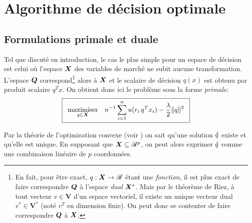 \section{Algorithme de décision optimale}




\subsection{Formulations primale et duale}

Tel que discuté en introduction, le cas le plus simple pour un espace de décision est
celui où l'espace $\X$ des variables de marché ne subit aucune transformation. L'espace
$\Q$ correspond\footnote{En fait, pour être exact, $q : \X \to \Re$ étant une
  \textit{fonction}, il est plus exact de faire correspondre $\Q$ à l'espace \textit{dual}
  $\X^*$. Mais par le théorème de Riez, à tout vecteur $v \in \bm V$ d'un espace vectoriel,
  il existe un unique vecteur dual $v^* \in \bm V^*$ (noté $v^T$ en dimension finie). On
  peut donc se contenter de faire correspondre $\Q$ à $\X$.} alors à $\X$ et le scalaire
de décision $q(x)$ est obtenu par produit scalaire $q^Tx$. On obtient donc ici le problème
sous la forme \textit{primale}:
{\begin{equation}
  \boxed{
  \maximizeEquation[q\in\X]{n^{-1}\sumi u(r_i\,q^Tx_i) - \frac{\lambda}{2}\|q\|^2}}
\end{equation}
\vspace{-\baselineskip}}

Par la théorie de l'optimisation convexe (voir \cite{boyd2004convex}) on sait qu'une
solution $\qh$ existe et qu'elle est unique. En supposant que $\X \subseteq \Re^p$, on peut alors
exprimer $\qh$ comme une combinaison linéaire de $p$ coordonnées.

